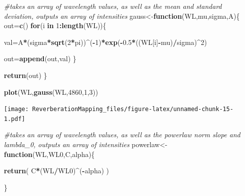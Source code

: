 \documentclass[]{article}
\newenvironment{Shaded}{\begin{snugshade}}{\end{snugshade}}
\newcommand{\CommentTok}[1]{\textcolor[rgb]{0.56,0.35,0.01}{\textit{#1}}}
\newcommand{\ControlFlowTok}[1]{\textcolor[rgb]{0.13,0.29,0.53}{\textbf{#1}}}
\newcommand{\DecValTok}[1]{\textcolor[rgb]{0.00,0.00,0.81}{#1}}
\newcommand{\FloatTok}[1]{\textcolor[rgb]{0.00,0.00,0.81}{#1}}
\newcommand{\KeywordTok}[1]{\textcolor[rgb]{0.13,0.29,0.53}{\textbf{#1}}}
\newcommand{\NormalTok}[1]{#1}
\newcommand{\OperatorTok}[1]{\textcolor[rgb]{0.81,0.36,0.00}{\textbf{#1}}}
\begin{document}
\begin{Shaded}
\begin{Highlighting}[]
\CommentTok{#takes an array of wavelength values, as well as the mean and standard deviation, outputs an array of intensities}
\NormalTok{gauss<-}\ControlFlowTok{function}\NormalTok{(WL,mu,sigma,A)\{}
\NormalTok{  out=}\KeywordTok{c}\NormalTok{()}
  \ControlFlowTok{for}\NormalTok{(i }\ControlFlowTok{in} \DecValTok{1}\OperatorTok{:}\KeywordTok{length}\NormalTok{(WL))\{}
    
\NormalTok{    val=A}\OperatorTok{*}\NormalTok{(sigma}\OperatorTok{*}\KeywordTok{sqrt}\NormalTok{(}\DecValTok{2}\OperatorTok{*}\NormalTok{pi))}\OperatorTok{^}\NormalTok{(}\OperatorTok{-}\DecValTok{1}\NormalTok{)}\OperatorTok{*}\KeywordTok{exp}\NormalTok{(}\OperatorTok{-}\FloatTok{0.5}\OperatorTok{*}\NormalTok{((WL[i]}\OperatorTok{-}\NormalTok{mu)}\OperatorTok{/}\NormalTok{sigma)}\OperatorTok{^}\DecValTok{2}\NormalTok{)}
    
    
\NormalTok{    out=}\KeywordTok{append}\NormalTok{(out,val)}
\NormalTok{  \}}
  
  \KeywordTok{return}\NormalTok{(out)}
\NormalTok{\}}
\end{Highlighting}
\end{Shaded}

\begin{Shaded}
\begin{Highlighting}[]
\KeywordTok{plot}\NormalTok{(WL,}\KeywordTok{gauss}\NormalTok{(WL,}\DecValTok{4860}\NormalTok{,}\DecValTok{1}\NormalTok{,}\DecValTok{3}\NormalTok{))}
\end{Highlighting}
\end{Shaded}

\texttt{[image: ReverberationMapping\_files/figure-latex/unnamed-chunk-15-1.pdf]}

\begin{Shaded}
\begin{Highlighting}[]
\CommentTok{#takes an array of wavelength values, as well as the powerlaw norm slope and lambda_0, outputs an array of intensities}
\NormalTok{powerlaw<-}\ControlFlowTok{function}\NormalTok{(WL,WL0,C,alpha)\{}
  
  \KeywordTok{return}\NormalTok{( C}\OperatorTok{*}\NormalTok{(WL}\OperatorTok{/}\NormalTok{WL0)}\OperatorTok{^}\NormalTok{(}\OperatorTok{-}\NormalTok{alpha)  )}
  
\NormalTok{\}}
\end{Highlighting}
\end{Shaded}
\end{document}
